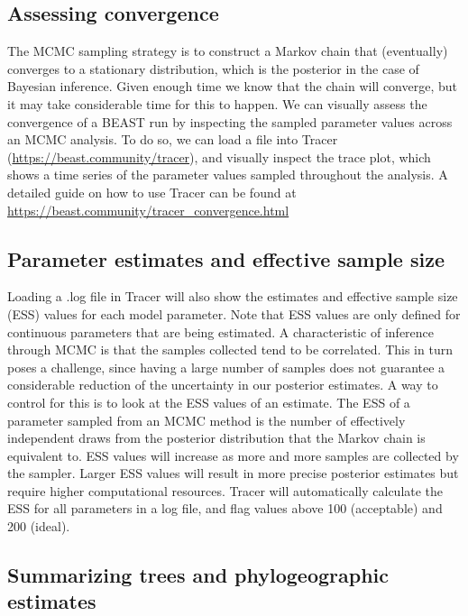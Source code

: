 \documentclass{article}
\newcommand{\code}[1]{
{\upshape\ttfamily{#1}}}
\begin{document}
\subsection*{Assessing convergence}

The MCMC sampling strategy is to construct a Markov chain that (eventually) converges to a stationary distribution, which is the posterior in the case of Bayesian inference.
Given enough time we know that the chain will converge, but it may take considerable time for this to happen. We can visually assess the convergence of a BEAST run by inspecting the sampled parameter values across an MCMC analysis.
To do so, we can load a\code{.log} file into Tracer (\url{https://beast.community/tracer}), and visually inspect the trace plot, which shows a time series of the parameter values sampled throughout the analysis.
A detailed guide on how to use Tracer can be found at \url{https://beast.community/tracer_convergence.html}

\subsection*{Parameter estimates and effective sample size}

Loading a .log file in Tracer will also show the estimates and effective sample size (ESS) values for each model parameter.
Note that ESS values are only defined for continuous parameters that are being estimated.
A characteristic of inference through MCMC is that the samples collected tend to be correlated.
This in turn poses a challenge, since having a large number of samples does not guarantee a considerable reduction of the uncertainty in our posterior estimates.
A way to control for this is to look at the ESS values of an estimate.
The ESS of a parameter sampled from an MCMC method is the number of effectively independent draws from the posterior distribution that the Markov chain is equivalent to.
ESS values will increase as more and more samples are collected by the sampler.
Larger ESS values will result in more precise posterior estimates but require higher computational resources.
Tracer will automatically calculate the ESS for all parameters in a log file, and flag values above 100 (acceptable) and 200 (ideal).

\subsection*{Summarizing trees and phylogeographic estimates}
\end{document}

